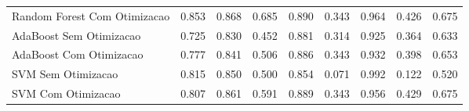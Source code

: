 \begin{table}[H]
\begin{adjustwidth}{ -1in }{ -1in }
\begin{tabular}{lrrrrrrrr}
      Random Forest Com Otimizacao &                        0.853 &                         0.868 &                            0.685 &                            0.890 &                          0.343 &                          0.964 &                                     0.426 &                                 0.675 \\
           AdaBoost Sem Otimizacao &                        0.725 &                         0.830 &                            0.452 &                            0.881 &                          0.314 &                          0.925 &                                     0.364 &                                 0.633 \\
           AdaBoost Com Otimizacao &                        0.777 &                         0.841 &                            0.506 &                            0.886 &                          0.343 &                          0.932 &                                     0.398 &                                 0.653 \\
                SVM Sem Otimizacao &                        0.815 &                         0.850 &                            0.500 &                            0.854 &                          0.071 &                          0.992 &                                     0.122 &                                 0.520 \\
                SVM Com Otimizacao &                        0.807 &                         0.861 &                            0.591 &                            0.889 &                          0.343 &                          0.956 &                                     0.429 &                                 0.675 \\
\bottomrule
\end{tabular}
    \end{adjustwidth}
    \renewcommand{\arraystretch}{1.0} %
\end{table}
